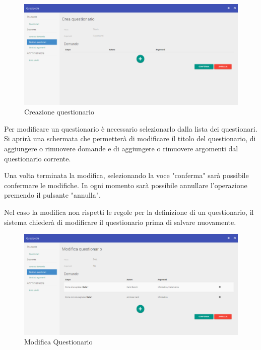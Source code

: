 \documentclass[12pt,a4paper]{article}
\begin{document}
		\begin{figure}[H]	
			\centering
			\includegraphics[width=1.0\linewidth]{../img/screenshot/creazioneQuestionario.png}
			\caption{Creazione questionario}
			\label{Creazione questionario}
		\end{figure}
		
		\par Per modificare un questionario è necessario selezionarlo dalla lista dei questionari. Si aprirà una schermata che permetterà di modificare il titolo del questionario, di aggiungere o rimuovere domande e di aggiungere o rimuovere argomenti dal questionario corrente. \\
		\par Una volta terminata la modifica, selezionando la voce "conferma" sarà possibile confermare le modifiche. In ogni momento sarà possibile annullare l'operazione premendo il pulsante "annulla". \\
			
		\par Nel caso la modifica non rispetti le regole per la definizione di un questionario, il sistema chiederà di modificare il questionario prima di salvare nuovamente. \\
		
		\begin{figure}[H]	
			\centering
			\includegraphics[width=1.0\linewidth]{../img/screenshot/modificaQuestionario.png}
			\caption{Modifica Questionario}
			\label{Modifica Questionario}
		\end{figure}
			
\end{document}

